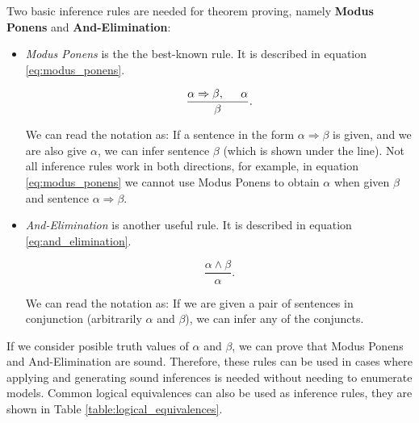 Two basic inference rules are needed for theorem proving, namely \textbf{Modus Ponens} and \textbf{And-Elimination}:

\begin{itemize}


\item \textit{Modus Ponens} is the the best-known rule. It is described in equation \ref{eq:modus_ponens}.

\begin{equation}
\dfrac{\alpha \Rightarrow \beta, \hspace{0.5cm} \alpha}{\beta}.
\label{eq:modus_ponens}
\end{equation}

We can read the notation as: If a sentence in the form $\alpha \Rightarrow \beta$ is given, and we are also give $\alpha$, we can infer sentence $\beta$ (which is shown under the line). Not all inference rules work in both directions, for example, in equation \ref{eq:modus_ponens} we cannot use Modus Ponens to obtain $\alpha$ when given $\beta$ and sentence $\alpha \Rightarrow \beta$.

\item \textit{And-Elimination} is another useful rule. It is described in equation \ref{eq:and_elimination}.


\begin{equation}
\dfrac{\alpha \wedge \beta}{\alpha}.
\label{eq:and_elimination}
\end{equation}

We can read the notation as: If we are given a pair of sentences in conjunction (arbitrarily $\alpha$ and $\beta$), we can infer any of the conjuncts.


\end{itemize}

If we consider posible truth values of $\alpha$ and $\beta$, we can prove that  Modus Ponens and And-Elimination are sound. Therefore, these rules can be used in cases where applying and generating sound inferences is needed without needing to enumerate models.
Common logical equivalences can also be used as inference rules, they are shown in Table \ref{table:logical_equivalences}. 


